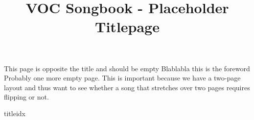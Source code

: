 \documentclass[twoside]{article}
\begin{document}
\title{VOC Songbook - Placeholder Titlepage}
\maketitle
\newpage
This page is opposite the title and should be empty
\newpage
Blablabla this is the foreword
\newpage
Probably one more empty page. This is important because we have a 
two-page layout and thus want to see whether a song that stretches over 
two pages requires flipping or not. 


\begin{songs}{titleidx}


































































\end{songs}
\end{document}
